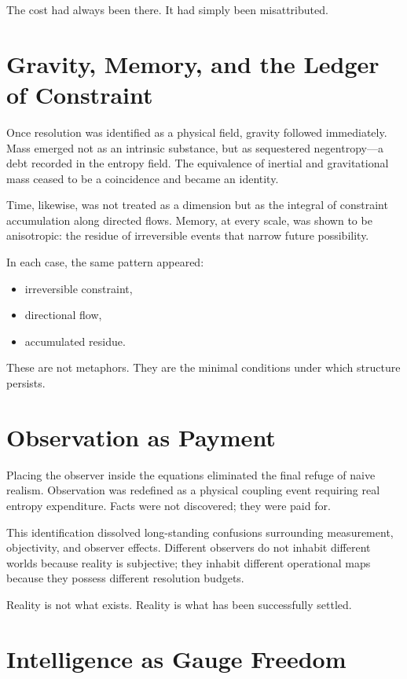 \documentclass[11pt]{book}
\begin{document}
The cost had always been there. It had simply been misattributed.

\section{Gravity, Memory, and the Ledger of Constraint}

Once resolution was identified as a physical field, gravity followed
immediately. Mass emerged not as an intrinsic substance, but as sequestered
negentropy—a debt recorded in the entropy field. The equivalence of inertial and
gravitational mass ceased to be a coincidence and became an identity.

Time, likewise, was not treated as a dimension but as the integral of constraint
accumulation along directed flows. Memory, at every scale, was shown to be
anisotropic: the residue of irreversible events that narrow future possibility.

In each case, the same pattern appeared:

\begin{itemize}
\item irreversible constraint,
\item directional flow,
\item accumulated residue.
\end{itemize}

These are not metaphors. They are the minimal conditions under which structure
persists.

\section{Observation as Payment}

Placing the observer inside the equations eliminated the final refuge of naive
realism. Observation was redefined as a physical coupling event requiring real
entropy expenditure. Facts were not discovered; they were paid for.

This identification dissolved long-standing confusions surrounding measurement,
objectivity, and observer effects. Different observers do not inhabit different
worlds because reality is subjective; they inhabit different operational maps
because they possess different resolution budgets.

Reality is not what exists.
Reality is what has been successfully settled.

\section{Intelligence as Gauge Freedom}
\end{document}
